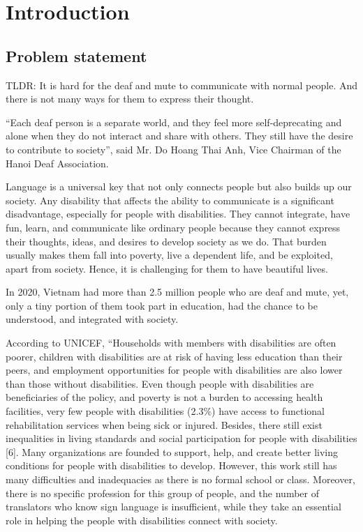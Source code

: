 \chapter {Introduction}
	
\section{Problem statement}

TLDR: It is hard for the deaf and mute to communicate with normal people. And there is not many ways for them to express their thought.

“Each deaf person is a separate world, and they feel more self-deprecating and alone when they do not interact and share with others. They still have the desire to contribute to society”, said Mr. Do Hoang Thai Anh, Vice Chairman of the Hanoi Deaf Association.

Language is a universal key that not only connects people but also builds up our society. Any disability that affects the ability to communicate is a significant disadvantage, especially for people with disabilities. They cannot integrate, have fun, learn, and communicate like ordinary people because they cannot express their thoughts, ideas, and desires to develop society as we do. That burden usually makes them fall into poverty, live a dependent life, and be exploited, apart from society. Hence, it is challenging for them to have beautiful lives.

In 2020, Vietnam had more than 2.5 million people who are deaf and mute, yet, only a tiny portion of them took part in education, had the chance to be understood, and integrated with society.

According to UNICEF, “Households with members with disabilities are often poorer, children with disabilities are at risk of having less education than their peers, and employment opportunities for people with disabilities are also lower than those without disabilities. Even though people with disabilities are beneficiaries of the policy, and poverty is not a burden to accessing health facilities, very few people with disabilities (2.3\%) have access to functional rehabilitation services when being sick or injured. Besides, there still exist inequalities in living standards and social participation for people with disabilities [6]. Many organizations are founded to support, help, and create better living conditions for people with disabilities to develop. However, this work still has many difficulties and inadequacies as there is no formal school or class. Moreover, there is no specific profession for this group of people, and the number of translators who know sign language is insufficient, while they take an essential role in helping the people with disabilities connect with society.

